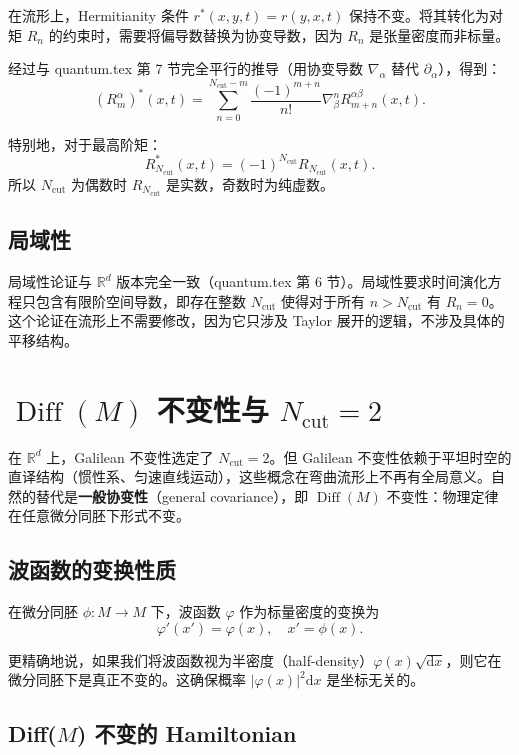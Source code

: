 \documentclass{book}
\newcommand{\mathd}{\mathrm{d}}
\begin{document}
在流形上，Hermitianity 条件 $r^*(x,y,t) = r(y,x,t)$ 保持不变。将其转化为对矩 $R_n$ 的约束时，需要将偏导数替换为协变导数，因为 $R_n$ 是张量密度而非标量。

经过与 quantum.tex 第 7 节完全平行的推导（用协变导数 $\nabla_\alpha$ 替代 $\partial_\alpha$），得到：
\begin{equation}
  (R_m^\alpha)^*(x,t) = \sum_{n=0}^{N_\text{cut}-m} \frac{(-1)^{m+n}}{n!} \nabla_\beta^n R_{m+n}^{\alpha\beta}(x,t). \label{eq:herm-moments}
\end{equation}

特别地，对于最高阶矩：
\[
R_{N_\text{cut}}^*(x,t) = (-1)^{N_\text{cut}} R_{N_\text{cut}}(x,t).
\]
所以 $N_\text{cut}$ 为偶数时 $R_{N_\text{cut}}$ 是实数，奇数时为纯虚数。

\section{局域性}

局域性论证与 $\mathbb{R}^d$ 版本完全一致（quantum.tex 第 6 节）。局域性要求时间演化方程只包含有限阶空间导数，即存在整数 $N_\text{cut}$ 使得对于所有 $n > N_\text{cut}$ 有 $R_n = 0$。这个论证在流形上不需要修改，因为它只涉及 Taylor 展开的逻辑，不涉及具体的平移结构。

\chapter{$\operatorname{Diff}(M)$ 不变性与 $N_\text{cut}=2$}

在 $\mathbb{R}^d$ 上，Galilean 不变性选定了 $N_\text{cut}=2$。但 Galilean 不变性依赖于平坦时空的直译结构（惯性系、匀速直线运动），这些概念在弯曲流形上不再有全局意义。自然的替代是\textbf{一般协变性}（general covariance），即 $\operatorname{Diff}(M)$ 不变性：物理定律在任意微分同胚下形式不变。

\section{波函数的变换性质}

在微分同胚 $\phi: M \to M$ 下，波函数 $\varphi$ 作为标量密度的变换为
\[
\varphi'(x') = \varphi(x), \quad x' = \phi(x).
\]

更精确地说，如果我们将波函数视为半密度（half-density）$\varphi(x) \sqrt{\mathd x}$，则它在微分同胚下是真正不变的。这确保概率 $|\varphi(x)|^2 \mathd x$ 是坐标无关的。

\section{Diff($M$) 不变的 Hamiltonian}
\end{document}
